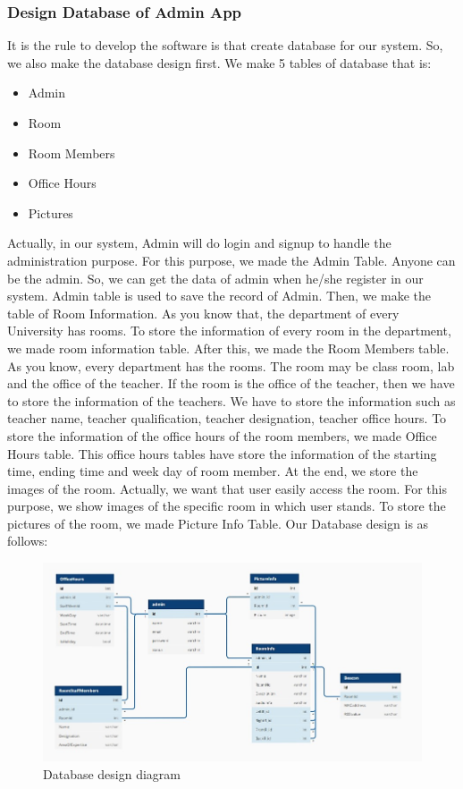 \subsubsection{Design Database of Admin App}
It is the rule to develop the software is that create database for our system. So, we also make the database design first. We make 5 tables of database that is:
\begin{itemize}
\item Admin
\item Room 
\item Room Members
\item Office Hours
\item Pictures
\end{itemize}
Actually, in our system, Admin will do login and signup to handle the administration purpose. For this purpose, we made the Admin Table. Anyone can be the admin. So, we can get the data of admin when he/she register in our system. Admin table is used to save the record of Admin. Then, we make the table of Room Information. As you know that, the department of every University has rooms. To store the information of every room in the department, we made room information table. After this, we made the Room Members table. As you know, every department has the rooms. The room may be class room, lab and the office of the teacher. If the room is the office of the teacher, then we have to store the information of the teachers. We have to store the information such as teacher name, teacher qualification, teacher designation, teacher office hours. To store the information of the office hours of the room members, we made Office Hours table. This office hours tables have store the information of the starting time, ending time and week day of room member. At the end, we store the images of the room. Actually, we want that user easily access the room. For this purpose, we show images of the specific room in which user stands. To store the pictures of the room, we made Picture Info Table.   
Our Database design is as follows:
\begin{figure}[h]
  		\centering
    		\includegraphics[scale=0.5]{./Figures/dbdesign}
\caption{Database design diagram}
\label{fig:13}
 		\end{figure}

